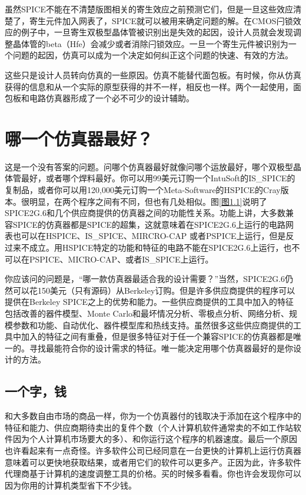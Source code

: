 虽然SPICE不能在不清楚版图相关的寄生效应之前预测它们，但是一旦这些效应清楚了，寄生元件加入网表了，SPICE就可以被用来确定问题的解。在CMOS闩锁效应的例子中，一旦寄生双极型晶体管被识别出是失效的起因，设计人员就会发现调整晶体管的beta（Hfe）会减少或者消除闩锁效应。一旦一个寄生元件被识别为一个问题的起因，仿真可以成为一个决定如何纠正这个问题的快速、有效的方法。

这些只是设计人员转向仿真的一些原因。仿真不能替代面包板。有时候，你从仿真获得的信息和从一个实际的原型获得的并不一样，相反也一样。两个一起使用，面包板和电路仿真器形成了一个必不可少的设计辅助。

\section{哪一个仿真器最好？}
这是一个没有答案的问题。问哪个仿真器最好就像问哪个运放最好，哪个双极型晶体管最好，或者哪个焊料最好。你可以用99美元订购一个IntuSoft的IS\_{SPICE}的复制品，或者你可以用120,000美元订购一个Meta-Software的HSPICE的Cray版本。很明显，在两个程序之间有不同，但也有几处相似。图\ref{图1.1}说明了SPICE2G.6和几个供应商提供的仿真器之间的功能性关系。功能上讲，大多数兼容SPICE的仿真器都是SPICE的超集，这就意味着在SPICE2G.6上运行的电路网表也可以在HSPICE、IS\_{SPICE}、MIRCRO-CAP \uppercase\expandafter{}或者PSPICE上运行，但是反过来不成立。用HSPICE特定的功能和特征的电路不能在SPICE2G.6上运行，也不可以在PSPICE、MICRO-CAP、或者IS\_{SPICE}上运行。

你应该问的问题是，“哪一款仿真器最适合我的设计需要？”当然，SPICE2G.6仍然可以花150美元（只有源码）从Berkeley订购。但是许多供应商提供的程序可以提供在Berkeley SPICE之上的优势和能力。一些供应商提供的工具中加入的特征包括改善的器件模型、Monte Carlo和最坏情况分析、零极点分析、网络分析、规模参数和功能、自动优化、器件模型库和热线支持。虽然很多这些供应商提供的工具中加入的特征之间有重叠，但是很多特征对于任一个兼容SPICE的仿真器都是唯一的。寻找最能符合你的设计需求的特征。唯一能决定用哪个仿真器最好的是你设计的方法。

\subsection{一个字，钱}
和大多数自由市场的商品一样，你为一个仿真器付的钱取决于添加在这个程序中的特征和能力、供应商期待卖出的复件个数（个人计算机软件通常卖的不如工作站软件因为个人计算机市场要大的多）、和你运行这个程序的机器速度。最后一个原因也许看起来有一点奇怪。许多软件公司已经同意在一台更快的计算机上运行仿真器意味着可以更快地获取结果，或者用它们的软件可以更多产。正因为此，许多软件代理商基于计算机的速度调整工具的价格。买的时候多看看。你也许会发现你可以因为你用的计算机类型省下不少钱。

